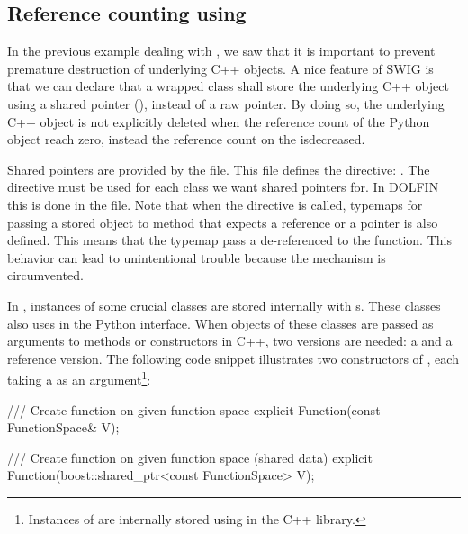 \vspace*{3pt}
\subsection{Reference counting using }


In the previous example dealing with , we saw that
it is important to prevent premature destruction of underlying C++
objects. A nice feature of SWIG is that we can declare that a wrapped
class shall store the underlying C++ object \pagebreak using a shared pointer
(), instead of a raw pointer. By doing so, the
underlying C++ object is not explicitly deleted when the reference
count of the Python object reach zero, instead the reference count on
the  is\break decreased.

Shared pointers are provided by the  file.
This file defines the directive: . The directive
must be used for each class we want shared pointers for. In DOLFIN
this is done in the  file. Note that when
the  directive is called, typemaps for passing a
 stored object to method that expects a reference or
a pointer is also defined. This means that the typemap pass a
de-referenced  to the function. This behavior can
lead to unintentional trouble because the  mechanism
is circumvented.

In \dolfin, instances of some crucial classes are stored internally
with s. These classes also uses 
in the Python interface. When objects of these classes are passed
as arguments to methods or constructors in C++, two versions are
needed: a  and a reference version. The following
code snippet illustrates two constructors of , each
taking a  as an argument\footnote{Instances of
 are internally stored using  in
the \dolfin C++ library.}:\vspace*{1.5pt}
\begin{c++}
/// Create function on given function space
explicit Function(const FunctionSpace& V);

/// Create function on given function space (shared data)
explicit Function(boost::shared_ptr<const FunctionSpace> V);
\end{c++}

